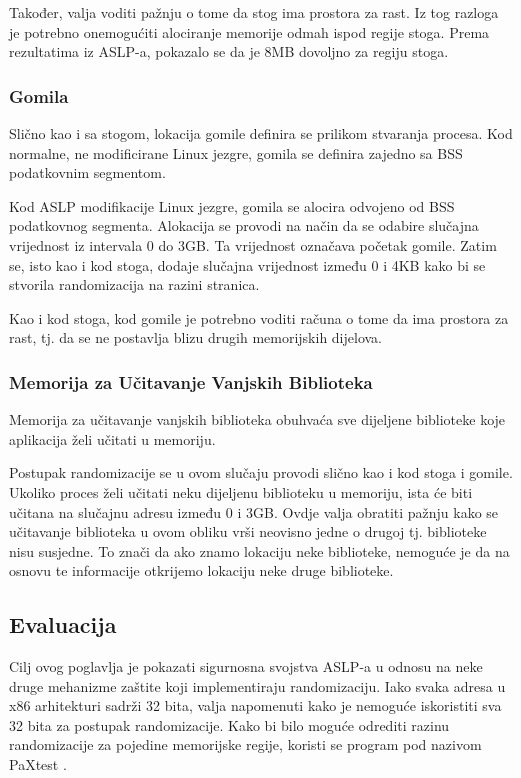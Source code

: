\documentclass[times, utf8, diplomski, numeric]{fer}
\begin{document}
Također, valja voditi pažnju o tome da stog ima prostora za rast.
Iz tog razloga je potrebno onemogućiti alociranje memorije odmah
ispod regije stoga. Prema rezultatima iz ASLP-a, pokazalo se da
je 8MB dovoljno za regiju stoga.

\subsubsection{Gomila}

Slično kao i sa stogom, lokacija gomile definira se prilikom
stvaranja procesa. Kod normalne, ne modificirane Linux jezgre,
gomila se definira zajedno sa BSS podatkovnim segmentom. 

Kod ASLP modifikacije Linux jezgre, gomila se alocira odvojeno od
BSS podatkovnog segmenta. Alokacija se provodi na način da se
odabire slučajna vrijednost iz intervala 0 do 3GB. Ta vrijednost
označava početak gomile. Zatim se, isto kao i kod stoga, dodaje
slučajna vrijednost između 0 i 4KB kako bi se stvorila
randomizacija na razini stranica.

Kao i kod stoga, kod gomile je potrebno voditi računa o tome da
ima prostora za rast, tj. da se ne postavlja blizu drugih
memorijskih dijelova.

\subsubsection{Memorija za Učitavanje Vanjskih Biblioteka}

Memorija za učitavanje vanjskih biblioteka
obuhvaća sve dijeljene biblioteke koje aplikacija želi učitati u
memoriju. 

Postupak randomizacije se u ovom slučaju provodi slično kao i kod
stoga i gomile. Ukoliko proces želi učitati neku dijeljenu
biblioteku u memoriju, ista će biti učitana na slučajnu adresu
između 0 i 3GB. Ovdje valja obratiti pažnju kako se učitavanje
biblioteka u ovom obliku vrši neovisno jedne o drugoj tj.
biblioteke nisu susjedne. To znači da ako znamo lokaciju neke
biblioteke, nemoguće je da na osnovu te informacije otkrijemo
lokaciju neke druge biblioteke.

\subsection{Evaluacija}

Cilj ovog poglavlja je pokazati sigurnosna svojstva ASLP-a u
odnosu na neke druge mehanizme zaštite koji implementiraju
randomizaciju. Iako svaka adresa u x86 arhitekturi sadrži 32
bita, valja napomenuti kako je nemoguće iskoristiti sva 32 bita
za postupak randomizacije. Kako bi bilo moguće odrediti razinu
randomizacije za pojedine memorijske regije, koristi se program
pod nazivom PaXtest \citep{pax_test}. 
\end{document}
